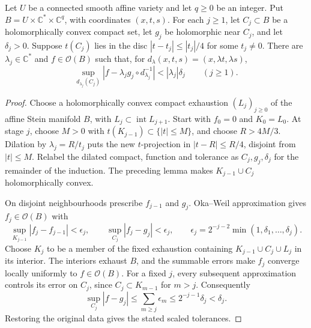 \begin{lemma}\label{lem:dilated-countable-holomorphic-tests}
Let $U$ be a connected smooth affine variety and let $q\geq0$ be an integer.
Put $B=U\times\mathbb C^*\times\mathbb C^q$, with coordinates $(x,t,s)$.
For each $j\geq1$, let $C_j\subset B$ be a holomorphically convex compact
set, let $g_j$ be holomorphic near $C_j$, and let $\delta_j>0$.
Suppose $t(C_j)$ lies in the disc
$|t-t_j|\leq|t_j|/4$ for some $t_j\neq0$.
There are $\lambda_j\in\mathbb C^*$ and $f\in\mathcal O(B)$ such that,
for $d_\lambda(x,t,s)=(x,\lambda t,\lambda s)$,
\[
 \sup_{d_{\lambda_j}(C_j)}
 |f-\lambda_j g_j\circ d_{\lambda_j}^{-1}|<|\lambda_j|\delta_j
 \qquad(j\geq1).
\]
\end{lemma}
\begin{proof}
Choose a holomorphically convex compact exhaustion $(L_j)_{j\geq0}$
of the affine Stein manifold $B$, with $L_j\subset\operatorname{int}L_{j+1}$.
Start with $f_0=0$ and $K_0=L_0$.
At stage $j$, choose $M>0$ with $t(K_{j-1})\subset\{|t|\leq M\}$,
and choose $R>4M/3$. Dilation by $\lambda_j=R/t_j$ puts the new
$t$-projection in $|t-R|\leq R/4$, disjoint from $|t|\leq M$.
Relabel the dilated compact, function and tolerance as
$C_j,g_j,\delta_j$ for the remainder of the induction.
The preceding lemma makes $K_{j-1}\cup C_j$ holomorphically convex.

On disjoint neighbourhoods prescribe $f_{j-1}$ and $g_j$.
Oka--Weil approximation gives $f_j\in\mathcal O(B)$ with
\[
 \sup_{K_{j-1}}|f_j-f_{j-1}|<\epsilon_j,
 \qquad \sup_{C_j}|f_j-g_j|<\epsilon_j,
 \qquad
 \epsilon_j=2^{-j-2}\min(1,\delta_1,\ldots,\delta_j).
\]
Choose $K_j$ to be a member of the fixed exhaustion containing
$K_{j-1}\cup C_j\cup L_j$ in its interior. The interiors exhaust $B$,
and the summable errors make $f_j$ converge locally uniformly to
$f\in\mathcal O(B)$. For a fixed $j$, every subsequent approximation
controls its error on $C_j$, since $C_j\subset K_{m-1}$ for $m>j$.
Consequently
\[
 \sup_{C_j}|f-g_j|
 \leq\sum_{m\geq j}\epsilon_m
 \leq2^{-j-1}\delta_j<\delta_j.
\]
Restoring the original data gives the stated scaled tolerances.
\end{proof}

